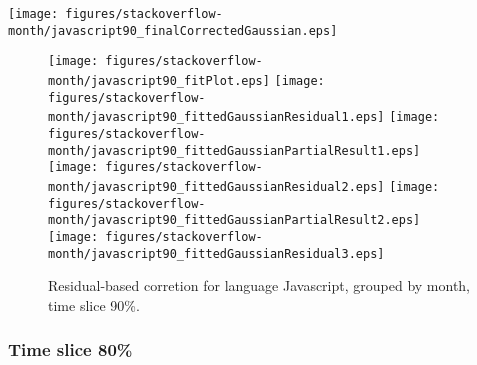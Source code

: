 \begin{center}
{\texttt{[image: figures/stackoverflow-month/javascript90\_finalCorrectedGaussian.eps]}}
\end{center}

\FloatBarrier

\begin{figure}[t]
\centering
{}
{\texttt{[image: figures/stackoverflow-month/javascript90\_fitPlot.eps]}}
{\texttt{[image: figures/stackoverflow-month/javascript90\_fittedGaussianResidual1.eps]}}
{\texttt{[image: figures/stackoverflow-month/javascript90\_fittedGaussianPartialResult1.eps]}}
{\texttt{[image: figures/stackoverflow-month/javascript90\_fittedGaussianResidual2.eps]}}
{\texttt{[image: figures/stackoverflow-month/javascript90\_fittedGaussianPartialResult2.eps]}}
{\texttt{[image: figures/stackoverflow-month/javascript90\_fittedGaussianResidual3.eps]}}
\caption{Residual-based corretion for language Javascript, grouped by month, time slice 90\%.}
\end{figure}


\FloatBarrier


\subsubsection{Time slice 80\%}

